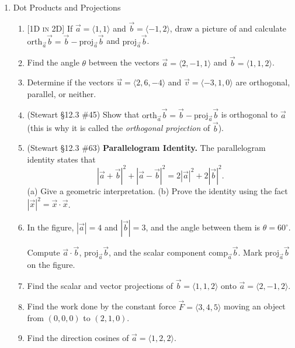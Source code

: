 \documentclass[12pt]{article}
\newcommand{\dimtag}[1]{{\footnotesize\textsc{[#1]}}\;}
\begin{document}
\begin{enumerate}
\item Dot Products and Projections
    \begin{enumerate}
        \item \dimtag{1D in 2D} If $\vec{a}= \langle 1,1 \rangle$ and $\vec{b}= \langle -1,2 \rangle$, draw a picture of and calculate $\text{orth}_{\vec{a}} \vec{b} = \vec b - \text{proj}_{\vec a}\vec b$ and $\text{proj}_{\vec{a}}\vec{b}$.
        \item Find the angle $\theta$ between the vectors $\vec a = \langle 2, -1, 1 \rangle$ and $\vec{b} = \langle 1, 1, 2 \rangle$.
        \item Determine if the vectors $\vec{u} = \langle 2, 6, -4 \rangle$ and $\vec{v} = \langle -3, 1, 0 \rangle$ are orthogonal, parallel, or neither.
        \item (Stewart \S12.3 \#45) Show that $\text{orth}_{\vec{a}}\vec{b} = \vec{b} - \text{proj}_{\vec{a}}\vec{b}$ is orthogonal to $\vec{a}$ (this is why it is called the \emph{orthogonal projection} of $\vec{b}$).
        \item (Stewart \S12.3 \#63) \textbf{Parallelogram Identity.} The parallelogram identity states that
        \[ |\vec{a}+\vec{b}|^2 + |\vec{a}-\vec{b}|^2 = 2|\vec{a}|^2 + 2|\vec{b}|^2. \]
        (a) Give a geometric interpretation. (b) Prove the identity using the fact $|\vec{x}|^2 = \vec{x}\cdot\vec{x}$.
        \item In the figure, $|\vec{a}|=4$ and $|\vec{b}|=3$, and the angle between them is $\theta=60^\circ$.
        \begin{center}
        \end{center}
        Compute $\vec{a}\cdot\vec{b}$, $\text{proj}_{\vec{a}}\vec{b}$, and the scalar component $\text{comp}_{\vec{a}}\vec{b}$. Mark $\text{proj}_{\vec{a}}\vec{b}$ on the figure.
        \item Find the scalar and vector projections of $\vec b=\langle 1,1,2\rangle$ onto $\vec a=\langle 2,-1,2\rangle$.
        \item Find the work done by the constant force $\vec F=\langle 3,4,5\rangle$ moving an object from $(0,0,0)$ to $(2,1,0)$.
        \item Find the direction cosines of $\vec a=\langle 1,2,2\rangle$.
    \end{enumerate}
\newpage


\end{enumerate}
\end{document}
